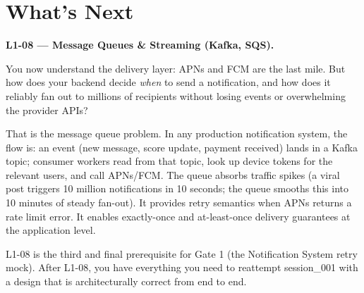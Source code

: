 \documentclass[11pt,a4paper]{article}
\begin{document}
\section{What's Next}

\begin{insightbox}
\textbf{L1-08 --- Message Queues \& Streaming (Kafka, SQS).}

You now understand the delivery layer: APNs and FCM are the last mile. But how does your backend decide \emph{when} to send a notification, and how does it reliably fan out to millions of recipients without losing events or overwhelming the provider APIs?

That is the message queue problem. In any production notification system, the flow is: an event (new message, score update, payment received) lands in a Kafka topic; consumer workers read from that topic, look up device tokens for the relevant users, and call APNs/FCM. The queue absorbs traffic spikes (a viral post triggers 10 million notifications in 10 seconds; the queue smooths this into 10 minutes of steady fan-out). It provides retry semantics when APNs returns a rate limit error. It enables exactly-once and at-least-once delivery guarantees at the application level.

L1-08 is the third and final prerequisite for Gate 1 (the Notification System retry mock). After L1-08, you have everything you need to reattempt session\_001 with a design that is architecturally correct from end to end.
\end{insightbox}
\end{document}

